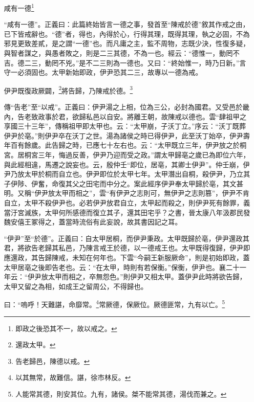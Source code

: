 咸有一德\footnote{即政之後恐其不一，故以戒之。}

{\noindent\shu{}\fzkt “咸有一德”。正義曰：此篇終始皆言一德之事，發首至“陳戒於德”敘其作戒之由，已下皆戒辭也。“德”者，得也，內得於心，行得其理，既得其理，執之必固，不為邪見更致差貳，是之謂“一德”也。而凡庸之主，監不周物，志既少決，性復多疑，與智者謀之，與愚者敗之，則是二三其德，不為一也。經云：“德惟一，動罔不吉。德二三，動罔不兇。”是不二三則為一德也。又曰：“終始惟一，時乃日新。”言守一必須固也。太甲新始即政，伊尹恐其二三，故專以一德為戒。 \par}

伊尹既復政厥闢，\footnote{還政太甲。}將告歸，乃陳戒於德。\footnote{告老歸邑，陳德以戒。}


{\noindent\zhuan{}\fzbyks 傳“告老”至“以戒”。正義曰：伊尹湯之上相，位為三公，必封為國君。又受邑於畿內，告老致政事於君，欲歸私邑以自安。將離王朝，故陳戒以德也。雲“肆祖甲之享國三十三年”，傳稱祖甲即太甲也。云：“太甲崩，子沃丁立。”序云：“沃丁既葬伊尹於亳。”則伊尹卒在沃丁之世。湯為諸侯之時已得伊尹，此至沃丁始卒，伊尹壽年百有餘歲。此告歸之時，已應七十左右也。云：“太甲既立三年，伊尹放之於桐宮。居桐宮三年，悔過反善，伊尹乃迎而受之政。”謂太甲歸亳之歲已為即位六年，與此經相違，馬遷之說妄也。云，殷仲壬“即位，居亳，其卿士伊尹”。仲壬崩，伊尹乃放太甲於桐而自立也。伊尹即位於太甲七年。太甲潛出自桐，殺伊尹，乃立其子伊陟、伊奮，命復其父之田宅而中分之。案此經序伊尹奉太甲歸於亳，其文甚明。又稱“伊尹放太甲而相之”，雲“有伊尹之志則可，無伊尹之志則篡”，伊尹不肯自立，太甲不殺伊尹也。必若伊尹放君自立，太甲起而殺之，則伊尹死有餘罪，義當汙宮滅族，太甲何所感德而復立其子，還其田宅乎？之書，晉太康八年汲郡民發魏安僖王冢得之，蓋當時流俗有此妄說，故其書因記之耳。 \par}

{\noindent\shu{}\fzkt “伊尹”至“於德”。正義曰：自太甲居桐，而伊尹秉政。太甲既歸於亳，伊尹還政其君，將欲告老歸其私邑，乃陳言戒王於德，以一德戒王也。太甲既得復歸，伊尹即應還政，其告歸陳戒，未知在何年也。下雲“今嗣王新服厥命”，則是初始即政，蓋太甲居亳之後即告老也。云：“在太甲，時則有若保衡。”保衡，伊尹也。襄二十一年云：“伊尹放太甲而相之，卒無怨色。”則伊尹又相太甲。蓋伊尹此時將欲告歸，太甲又留之為相，如成王之留周公，不得歸也。 \par}

曰：“嗚呼！天難諶，命靡常。\footnote{以其無常，故難信。諶，徐巿林反。}常厥德，保厥位。厥德匪常，九有以亡。\footnote{人能常其德，則安其位。九有，諸侯。桀不能常其德，湯伐而兼之。}

